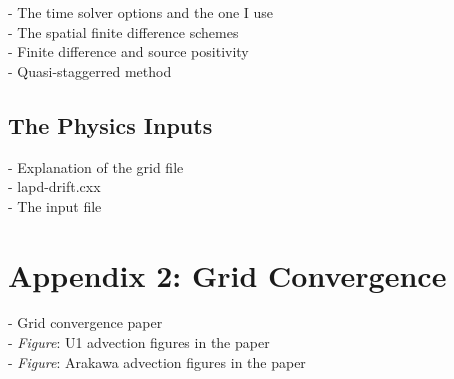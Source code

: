 \documentclass[12pt]{article}
\begin{document}
- The time solver options and the one I use \\
- The spatial finite difference schemes \\
- Finite difference and source positivity \\
- Quasi-staggerred method \\

\subsection{The Physics Inputs}

- Explanation of the grid file \\
- lapd-drift.cxx \\
- The input file \\

\section{Appendix 2: Grid Convergence}

- Grid convergence paper \\
- \emph{Figure}: U1 advection figures in the paper \\
- \emph{Figure}: Arakawa advection figures in the paper \\
\end{document}
